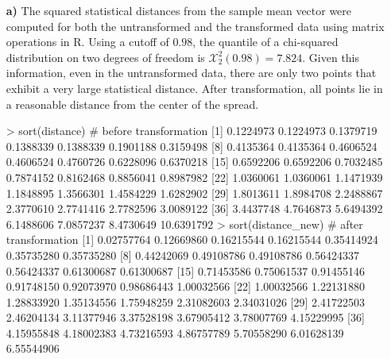 \begin{enumerate}
	\item[\bf{a)}] The squared statistical distances from the sample mean vector were computed for both the untransformed and the transformed data using matrix operations in R. Using a cutoff of $0.98$, the quantile of a chi-squared distribution on two degrees of freedom is $\mathcal{X}_2^2(0.98)=7.824$. Given this information, even in the untransformed data, there are only two points that exhibit a very large statistical distance. After transformation, all points lie in a reasonable distance from the center of the spread.
\begin{rc}
> sort(distance) # before transformation
 [1]  0.1224973  0.1224973  0.1379719  0.1388339  0.1388339  0.1901188  0.3159498
 [8]  0.4135364  0.4135364  0.4606524  0.4606524  0.4760726  0.6228096  0.6370218
[15]  0.6592206  0.6592206  0.7032485  0.7874152  0.8162468  0.8856041  0.8987982
[22]  1.0360061  1.0360061  1.1471939  1.1848895  1.3566301  1.4584229  1.6282902
[29]  1.8013611  1.8984708  2.2488867  2.3770610  2.7741416  2.7782596  3.0089122
[36]  3.4437748  4.7646873  5.6494392  6.1488606  7.0857237  8.4730649 10.6391792
> sort(distance_new) # after transformation
 [1] 0.02757764 0.12669860 0.16215544 0.16215544 0.35414924 0.35735280 0.35735280
 [8] 0.44242069 0.49108786 0.49108786 0.56424337 0.56424337 0.61300687 0.61300687
[15] 0.71453586 0.75061537 0.91455146 0.91748150 0.92073970 0.98686443 1.00032566
[22] 1.00032566 1.22131880 1.28833920 1.35134556 1.75948259 2.31082603 2.34031026
[29] 2.41722503 2.46204134 3.11377946 3.37528198 3.67905412 3.78007769 4.15229995
[36] 4.15955848 4.18002383 4.73216593 4.86757789 5.70558290 6.01628139 6.55544906
\end{rc}


\end{enumerate}

